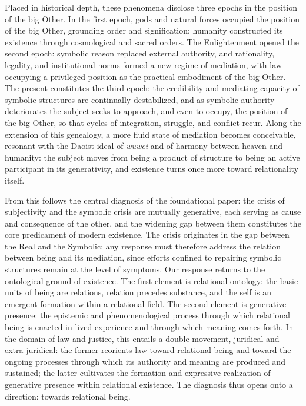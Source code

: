 Placed in historical depth, these phenomena disclose three epochs in the position of the big Other. In the first epoch, gods and natural forces occupied the position of the big Other, grounding order and signification; humanity constructed its existence through cosmological and sacred orders. The Enlightenment opened the second epoch: symbolic reason replaced external authority, and rationality, legality, and institutional norms formed a new regime of mediation, with law occupying a privileged position as the practical embodiment of the big Other. The present constitutes the third epoch: the credibility and mediating capacity of symbolic structures are continually destabilized, and as symbolic authority deteriorates the subject seeks to approach, and even to occupy, the position of the big Other, so that cycles of integration, struggle, and conflict recur. Along the extension of this genealogy, a more fluid state of mediation becomes conceivable, resonant with the Daoist ideal of \emph{wuwei} and of harmony between heaven and humanity: the subject moves from being a product of structure to being an active participant in its generativity, and existence turns once more toward relationality itself.

From this follows the central diagnosis of the foundational paper: the crisis of subjectivity and the symbolic crisis are mutually generative, each serving as cause and consequence of the other, and the widening gap between them constitutes the core predicament of modern existence. The crisis originates in the gap between the Real and the Symbolic; any response must therefore address the relation between being and its mediation, since efforts confined to repairing symbolic structures remain at the level of symptoms. Our response returns to the ontological ground of existence. The first element is relational ontology: the basic units of being are relations, relation precedes substance, and the self is an emergent formation within a relational field. The second element is generative presence: the epistemic and phenomenological process through which relational being is enacted in lived experience and through which meaning comes forth. In the domain of law and justice, this entails a double movement, juridical and extra-juridical: the former reorients law toward relational being and toward the ongoing processes through which its authority and meaning are produced and sustained; the latter cultivates the formation and expressive realization of generative presence within relational existence. The diagnosis thus opens onto a direction: towards relational being.


